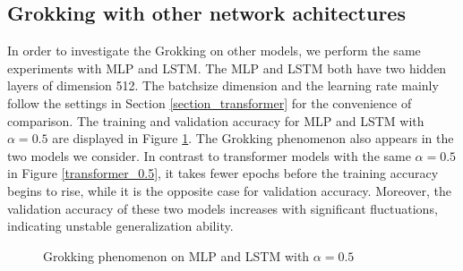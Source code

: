\documentclass[UTF8]{article}
\begin{document}
\subsection{Grokking with other network achitectures}

In order to investigate the Grokking on other models, we perform the same experiments with MLP and LSTM. The MLP and LSTM both have two hidden layers of dimension 512. The batchsize dimension and the learning rate mainly follow the settings in Section \ref{section_transformer} for the convenience of comparison. The training and validation accuracy for MLP and LSTM with $\alpha=0.5$ are displayed in Figure \ref{mlplstm}. The Grokking phenomenon also appears in the two models we consider. In contrast to transformer models with the same $\alpha=0.5$ in Figure \ref{transformer_0.5}, it takes fewer epochs before the training accuracy begins to rise, while it is the opposite case for validation accuracy. Moreover, the validation accuracy of these two models increases with significant fluctuations, indicating unstable generalization ability.

\begin{figure}[htb]
  \centering
  \vspace{-6mm}
  \caption{Grokking phenomenon on MLP and LSTM with $\alpha=0.5$}
  \label{mlplstm}
\end{figure}
\end{document}
